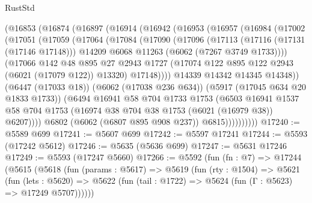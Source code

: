 \begin{lexlean}{RustStd}
\begin{coremodule}
        (@16853
          (@16874
            (@16897
              (@16914
                (@16942
                  (@16953
                    (@16957
                      (@16984
                        (@17002
                          (@17051
                            (@17059
                              (@17064
                                (@17084
                                  (@17090
                                    (@17096
                                      (@17113
                                        (@17116 (@17131 (@17146 @17148)))
                                        @14209
                                        @6068
                                        @11263
                                        (@6062 (@7267 @3749 @1733))))
                                    (@17066
                                      @142
                                      @48
                                      @895
                                      @27
                                      @2943
                                      @1727
                                      (@17074 @122 @895 @122 @2943 (@6021 (@17079 @122)) @13320)
                                      @17148))))
                              @14339
                              @14342
                              @14345
                              @14348))
                          (@6447 (@17033 @18))
                          (@6062 (@17038 @236 @634))
                          (@5917 (@17045 @634 @20 @1833 @1733))
                          (@6494
                            @16941
                            @58
                            @704
                            @1733
                            @1753
                            (@6503
                              @16941
                              @1537
                              @58
                              @704
                              @1753
                              (@16974 @38 @704 @38 @1753 (@6021 (@16979 @38)) @6207))))
                        @6802
                        (@6062 (@6807 @895 @908 @237))
                        @6815))))))))))
@17240 := @5589 @699
@17241 := @5607 @699
@17242 := @5597 @17241
@17244 := @5593 (@17242 @5612)
@17246 := @5635 (@5636 @699)
@17247 := @5631 @17246
@17249 := @5593 (@17247 @5660)
@17266 := @5592
    (fun (fn : @7) =>
    @17244
      (@5615
        (@5618
          (fun (params : @5617) =>
          @5619
            (fun (rty : @1504) =>
            @5621
              (fun (lets : @5620) =>
              @5622 (fun (tail : @1722) => @5624 (fun (Γ : @5623) => @17249 @5707))))))

\end{coremodule}
\end{lexlean}

